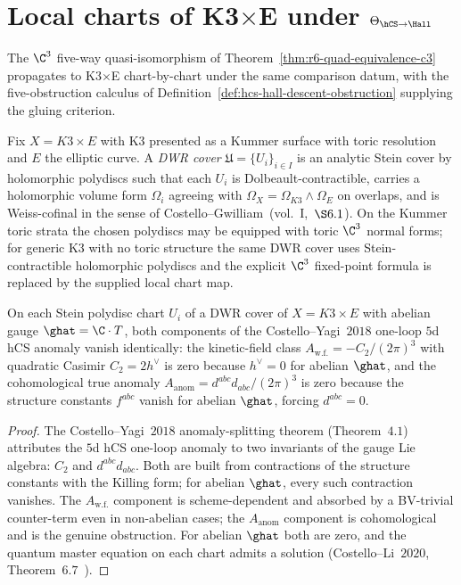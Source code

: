 \section{Local charts of K3\texorpdfstring{$\times$E}{xE} under
\texorpdfstring{$\Theta_{\hCS\to\Hall}$}{Theta hCS to Hall}}
\label{sec:cy3-chain-level-bridge-k3e-local-charts}

The $\C^3$ five-way quasi-isomorphism of
Theorem~\ref{thm:r6-quad-equivalence-c3} propagates to
K3$\times$E chart-by-chart under the same comparison datum, with the
five-obstruction calculus of
Definition~\ref{def:hcs-hall-descent-obstruction} supplying the gluing
criterion.

\begin{definition}
\label{def:r6-dwr-cover-k3e-inscribed}
Fix $X=K3\times E$ with K3 presented as a Kummer surface with toric
resolution and $E$ the elliptic curve. A \emph{DWR cover}
$\mathfrak U=\{U_i\}_{i\in I}$ is an analytic Stein cover by
holomorphic polydiscs such that each $U_i$ is Dolbeault-contractible,
carries a holomorphic volume form $\Omega_i$ agreeing with
$\Omega_X=\Omega_{K3}\wedge\Omega_E$ on overlaps, and is Weiss-cofinal
in the sense of Costello--Gwilliam~\textup{(}vol.~I,~$\S 6.1$\textup{)}.
On the Kummer toric strata the chosen polydiscs may be equipped with
toric $\C^3$ normal forms; for generic K3 with no toric structure the
same DWR cover uses Stein-contractible holomorphic polydiscs and the
explicit $\C^3$ fixed-point formula is replaced by the supplied local
chart map.
\end{definition}

\begin{proposition}
\label{prop:r6-chartwise-anomaly-vanish-k3e-inscribed}
On each Stein polydisc chart $U_i$ of a DWR cover of $X=K3\times E$ with
abelian gauge $\ghat=\C\cdot T$, both components of the
Costello--Yagi~$2018$ one-loop $5$d hCS anomaly vanish identically:
the kinetic-field class
$A_{\mathrm{w.f.}}=-C_2/(2\pi)^3$ with quadratic Casimir $C_2=2h^\vee$
is zero because $h^\vee=0$ for abelian $\ghat$, and the cohomological
true anomaly $A_{\mathrm{anom}}=d^{abc}d_{abc}/(2\pi)^3$ is zero
because the structure constants $f^{abc}$ vanish for abelian
$\ghat$, forcing $d^{abc}=0$.
\end{proposition}

\begin{proof}
The Costello--Yagi~$2018$ anomaly-splitting theorem
\textup{(}Theorem~$4.1$\textup{)} attributes the $5$d hCS one-loop
anomaly to two invariants of the gauge Lie algebra:
$C_2$ and $d^{abc}d_{abc}$. Both are built from contractions of the
structure constants with the Killing form; for abelian $\ghat$, every
such contraction vanishes. The $A_{\mathrm{w.f.}}$ component is
scheme-dependent and absorbed by a BV-trivial counter-term even in
non-abelian cases; the $A_{\mathrm{anom}}$ component is cohomological
and is the genuine obstruction. For abelian $\ghat$ both are zero,
and the quantum master equation on each chart admits a solution
\textup{(}Costello--Li~$2020$, Theorem~$6.7$~\cite{CostelloLi2020}\textup{)}.
\end{proof}

